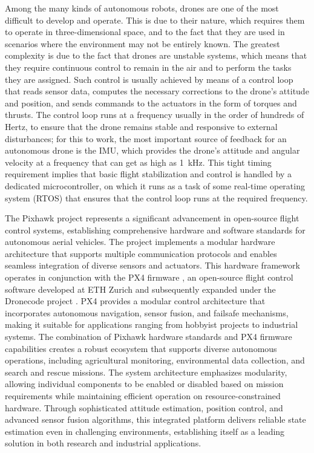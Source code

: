 Among the many kinds of autonomous robots, drones are one of the most difficult to develop and operate. This is due to their nature, which requires them to operate in three-dimensional space, and to the fact that they are used in scenarios where the environment may not be entirely known. The greatest complexity is due to the fact that drones are unstable systems, which means that they require continuous control to remain in the air and to perform the tasks they are assigned. Such control is usually achieved by means of a control loop that reads sensor data, computes the necessary corrections to the drone's attitude and position, and sends commands to the actuators in the form of torques and thrusts. The control loop runs at a frequency usually in the order of hundreds of Hertz, to ensure that the drone remains stable and responsive to external disturbances; for this to work, the most important source of feedback for an autonomous drone is the IMU, which provides the drone's attitude and angular velocity at a frequency that can get as high as \SI{1}{\kilo\hertz}. This tight timing requirement implies that basic flight stabilization and control is handled by a dedicated microcontroller, on which it runs as a task of some real-time operating system (RTOS) that ensures that the control loop runs at the required frequency.

The Pixhawk project \cite{meier_pixhawk_2011,meier_pixhawk_2012} represents a significant advancement in open-source flight control systems, establishing comprehensive hardware and software standards for autonomous aerial vehicles. The project implements a modular hardware architecture that supports multiple communication protocols and enables seamless integration of diverse sensors and actuators. This hardware framework operates in conjunction with the PX4 firmware \cite{meier_px4_2015}, an open-source flight control software developed at ETH Zurich and subsequently expanded under the Dronecode project \cite{dronecode_foundation_dronecode_nodate}. PX4 provides a modular control architecture that incorporates autonomous navigation, sensor fusion, and failsafe mechanisms, making it suitable for applications ranging from hobbyist projects to industrial systems. The combination of Pixhawk hardware standards and PX4 firmware capabilities creates a robust ecosystem that supports diverse autonomous operations, including agricultural monitoring, environmental data collection, and search and rescue missions. The system architecture emphasizes modularity, allowing individual components to be enabled or disabled based on mission requirements while maintaining efficient operation on resource-constrained hardware. Through sophisticated attitude estimation, position control, and advanced sensor fusion algorithms, this integrated platform delivers reliable state estimation even in challenging environments, establishing itself as a leading solution in both research and industrial applications.

